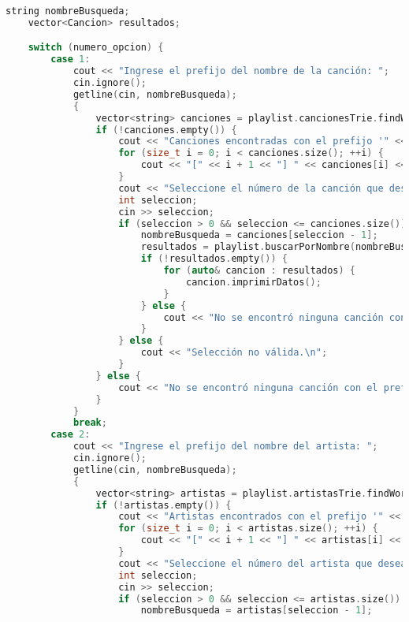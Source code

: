 \documentclass[corference]{IEEEtran}
\begin{document}
\begin{flushleft}
\begin{sloppypar}
\begin{lstlisting}[language=C++, style=mystyle, caption={Cabecera de la Clase Menú}]
    string nombreBusqueda;
    vector<Cancion> resultados;

    switch (numero_opcion) {
        case 1:
            cout << "Ingrese el prefijo del nombre de la canción: ";
            cin.ignore();
            getline(cin, nombreBusqueda);
            {
                vector<string> canciones = playlist.cancionesTrie.findWordsWithPrefix(nombreBusqueda);
                if (!canciones.empty()) {
                    cout << "Canciones encontradas con el prefijo '" << nombreBusqueda << "':\n";
                    for (size_t i = 0; i < canciones.size(); ++i) {
                        cout << "[" << i + 1 << "] " << canciones[i] << endl;
                    }
                    cout << "Seleccione el número de la canción que desea buscar: ";
                    int seleccion;
                    cin >> seleccion;
                    if (seleccion > 0 && seleccion <= canciones.size()) {
                        nombreBusqueda = canciones[seleccion - 1];
                        resultados = playlist.buscarPorNombre(nombreBusqueda, false);
                        if (!resultados.empty()) {
                            for (auto& cancion : resultados) {
                                cancion.imprimirDatos();
                            }
                        } else {
                            cout << "No se encontró ninguna canción con el nombre " << nombreBusqueda << ".\n";
                        }
                    } else {
                        cout << "Selección no válida.\n";
                    }
                } else {
                    cout << "No se encontró ninguna canción con el prefijo " << nombreBusqueda << ".\n";
                }
            }
            break;
        case 2:
            cout << "Ingrese el prefijo del nombre del artista: ";
            cin.ignore();
            getline(cin, nombreBusqueda);
            {
                vector<string> artistas = playlist.artistasTrie.findWordsWithPrefix(nombreBusqueda);
                if (!artistas.empty()) {
                    cout << "Artistas encontrados con el prefijo '" << nombreBusqueda << "':\n";
                    for (size_t i = 0; i < artistas.size(); ++i) {
                        cout << "[" << i + 1 << "] " << artistas[i] << endl;
                    }
                    cout << "Seleccione el número del artista que desea buscar: ";
                    int seleccion;
                    cin >> seleccion;
                    if (seleccion > 0 && seleccion <= artistas.size()) {
                        nombreBusqueda = artistas[seleccion - 1];

\end{lstlisting}
\end{sloppypar}
\end{flushleft}
\end{document}
